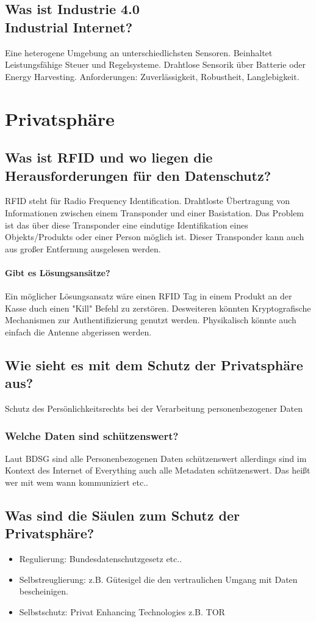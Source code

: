 	\subsection{Was ist Industrie 4.0 \\ Industrial Internet?}
	Eine heterogene Umgebung an unterschiedlichsten Sensoren. Beinhaltet Leistungsfähige Steuer\- und Regelsysteme.
	Drahtlose Sensorik über Batterie oder Energy Harvesting.
	Anforderungen: Zuverlässigkeit, Robustheit, Langlebigkeit.
	
\section{Privatsphäre}
	\subsection{Was ist RFID und wo liegen die Herausforderungen für den Datenschutz?}
	RFID steht für Radio Frequency Identification. Drahtloste Übertragung von Informationen zwischen einem Transponder und einer Basistation.
	Das Problem ist das über diese Transponder eine eindutige Identifikation eines Objekts/Produkts oder einer Person möglich ist. Dieser Transponder kann auch aus großer Entfernung ausgelesen werden.
	\paragraph{Gibt es Lösungsansätze?}
	Ein möglicher Lösungsansatz wäre einen RFID Tag in einem Produkt an der Kasse duch einen "Kill" Befehl zu zerstören.
	Desweiteren könnten Kryptografische Mechanismen zur Authentifizierung genutzt werden.
	Physikalisch könnte auch einfach die Antenne abgerissen werden.
	
	\subsection{Wie sieht es mit dem Schutz der Privatsphäre aus?}
	Schutz des Persönlichkeitsrechts bei der Verarbeitung personenbezogener Daten 
	\subsubsection{Welche Daten sind schützenswert?}
	Laut BDSG sind alle Personenbezogenen Daten schützenswert allerdings sind im Kontext des Internet of Everything auch alle Metadaten schützenswert. Das heißt wer mit wem wann kommuniziert etc..
	
	\subsection{Was sind die Säulen zum Schutz der Privatsphäre?}
	\begin{itemize}
		\item Regulierung: Bundesdatenschutzgesetz etc..
		\item Selbstreuglierung: z.B. Gütesigel die den vertraulichen Umgang mit Daten bescheinigen.
		\item Selbstschutz: Privat Enhancing Technologies z.B. TOR
	\end{itemize}
	
